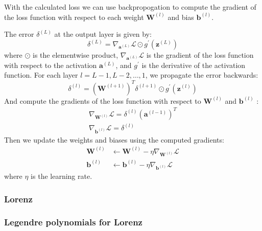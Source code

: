 With the calculated loss we can use backpropogation to compute the gradient of the loss function with respect to each weight $\mathbf{W}^{(l)}$ and bias $\mathbf{b}^{(l)}$. 

The error $\delta^{(L)}$ at the output layer is given by:
$$
\delta^{(L)}=\nabla_{\mathbf{a}^{(L)}} \mathcal{L} \odot g^{\prime}\left(\mathbf{z}^{(L)}\right)
$$
where $\odot$ is the elementwise product, $\nabla_{\mathbf{a}^{(L)}} \mathcal{L}$ is the gradient of the loss function with respect to the activation $\mathbf{a}^{(L)}$, and $g^{\prime}$ is the derivative of the activation function. For each layer $l=L-1, L-2, \ldots, 1$, we propagate the error backwards:
$$
    \delta^{(l)}=\left(\mathbf{W}^{(l+1)}\right)^T \delta^{(l+1)} \odot g^{\prime}\left(\mathbf{z}^{(l)}\right)
$$
And compute the gradients of the loss function with respect to $\mathbf{W}^{(l)}$ and $\mathbf{b}^{(l)}$ :
$$
\begin{gathered}
\nabla_{\mathbf{W}^{(l)}} \mathcal{L}=\delta^{(l)}\left(\mathbf{a}^{(l-1)}\right)^T \\
\nabla_{\mathbf{b}^{(l)}} \mathcal{L}=\delta^{(l)}
\end{gathered}
$$
Then we update the weights and biases using the computed gradients:
$$
\begin{aligned}
\mathbf{W}^{(l)} & \leftarrow \mathbf{W}^{(l)}-\eta \nabla_{\mathbf{W}^{(l)}} \mathcal{L} \\
\mathbf{b}^{(l)} & \leftarrow \mathbf{b}^{(l)}-\eta \nabla_{\mathbf{b}^{(l)}} \mathcal{L}
\end{aligned}
$$
where $\eta$ is the learning rate.

\subsubsection{Lorenz}

\subsubsection{Legendre polynomials for Lorenz}

 
